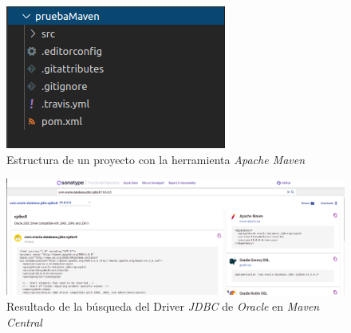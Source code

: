 \documentclass[11pt,a4paper]{article}
\begin{document}
\begin{figure}
\centering
\includegraphics[scale=1]{images/estructuraMAVEN.png}
\caption{Estructura de un proyecto con la herramienta \emph{Apache Maven}}
\label{fig:estructuraMAVEN}
\end{figure}

\begin{landscape}
\begin{figure}
\centering
\includegraphics[scale=0.4]{images/mavenCentral.png}
\caption{Resultado de la búsqueda del Driver \emph{JDBC} de \emph{Oracle} en \emph{Maven Central}}
\label{fig:mavenCentral}
\end{figure}
\end{landscape}
\end{document}

